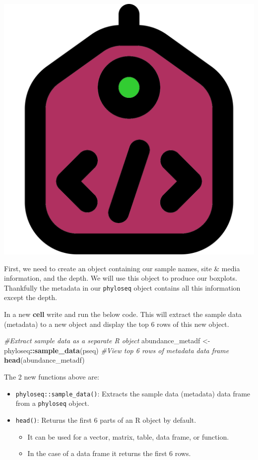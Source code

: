\documentclass[
]{book}
\newenvironment{Shaded}{\begin{snugshade}}{\end{snugshade}}
\newcommand{\CommentTok}[1]{\textcolor[rgb]{0.56,0.35,0.01}{\textit{#1}}}
\newcommand{\FunctionTok}[1]{\textcolor[rgb]{0.13,0.29,0.53}{\textbf{#1}}}
\newcommand{\NormalTok}[1]{#1}
\newcommand{\OtherTok}[1]{\textcolor[rgb]{0.56,0.35,0.01}{#1}}
\newcommand{\SpecialCharTok}[1]{\textcolor[rgb]{0.81,0.36,0.00}{\textbf{#1}}}
\providecommand{\tightlist}{%
  \setlength{\itemsep}{0pt}\setlength{\parskip}{0pt}}
\begin{document}
\includegraphics{figures/metadata.png}

First, we need to create an object containing our sample names, site \& media information, and the depth.
We will use this object to produce our boxplots.
Thankfully the metadata in our \texttt{phyloseq} object contains all this information except the depth.

In a new \textbf{cell} write and run the below code. This will extract the sample data (metadata) to a new object and display the top 6 rows of this new object.

\begin{Shaded}
\begin{Highlighting}[]
\CommentTok{\#Extract sample data as a separate R object}
\NormalTok{abundance\_metadf }\OtherTok{\textless{}{-}}\NormalTok{ phyloseq}\SpecialCharTok{::}\FunctionTok{sample\_data}\NormalTok{(pseq)}
\CommentTok{\#View top 6 rows of metadata data frame}
\FunctionTok{head}\NormalTok{(abundance\_metadf)}
\end{Highlighting}
\end{Shaded}

The 2 new functions above are:

\begin{itemize}
\tightlist
\item
  \texttt{phyloseq::sample\_data()}: Extracts the sample data (metadata) data frame from a \texttt{phyloseq} object.
\item
  \texttt{head()}: Returns the first 6 parts of an R object by default.

  \begin{itemize}
  \tightlist
  \item
    It can be used for a vector, matrix, table, data frame, or function.
  \item
    In the case of a data frame it returns the first 6 rows.
  \end{itemize}
\end{itemize}
\end{document}
